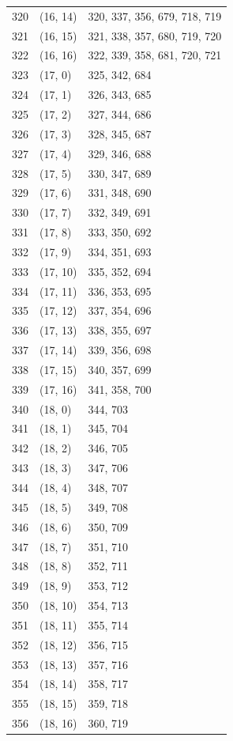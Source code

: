\documentclass{article}
\begin{document}
\begin{longtable}{lll}
  320 & (16, 14) & 320, 337, 356, 679, 718, 719 \\
  321 & (16, 15) & 321, 338, 357, 680, 719, 720 \\
  322 & (16, 16) & 322, 339, 358, 681, 720, 721 \\
  323 & (17, 0) & 325, 342, 684 \\
  324 & (17, 1) & 326, 343, 685 \\
  325 & (17, 2) & 327, 344, 686 \\
  326 & (17, 3) & 328, 345, 687 \\
  327 & (17, 4) & 329, 346, 688 \\
  328 & (17, 5) & 330, 347, 689 \\
  329 & (17, 6) & 331, 348, 690 \\
  330 & (17, 7) & 332, 349, 691 \\
  331 & (17, 8) & 333, 350, 692 \\
  332 & (17, 9) & 334, 351, 693 \\
  333 & (17, 10) & 335, 352, 694 \\
  334 & (17, 11) & 336, 353, 695 \\
  335 & (17, 12) & 337, 354, 696 \\
  336 & (17, 13) & 338, 355, 697 \\
  337 & (17, 14) & 339, 356, 698 \\
  338 & (17, 15) & 340, 357, 699 \\
  339 & (17, 16) & 341, 358, 700 \\
  340 & (18, 0) & 344, 703 \\
  341 & (18, 1) & 345, 704 \\
  342 & (18, 2) & 346, 705 \\
  343 & (18, 3) & 347, 706 \\
  344 & (18, 4) & 348, 707 \\
  345 & (18, 5) & 349, 708 \\
  346 & (18, 6) & 350, 709 \\
  347 & (18, 7) & 351, 710 \\
  348 & (18, 8) & 352, 711 \\
  349 & (18, 9) & 353, 712 \\
  350 & (18, 10) & 354, 713 \\
  351 & (18, 11) & 355, 714 \\
  352 & (18, 12) & 356, 715 \\
  353 & (18, 13) & 357, 716 \\
  354 & (18, 14) & 358, 717 \\
  355 & (18, 15) & 359, 718 \\
  356 & (18, 16) & 360, 719 \\
\end{longtable}
\end{document}
